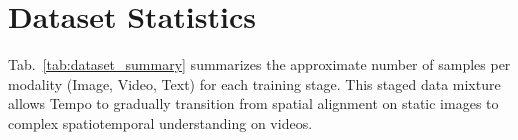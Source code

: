 
\section{Dataset Statistics}
\label{supp:dataset_details}

Tab.~\ref{tab:dataset_summary} summarizes the approximate number of samples per modality (Image, Video, Text) for each training stage. This staged data mixture allows Tempo to gradually transition from spatial alignment on static images to complex spatiotemporal understanding on videos.

\begin{table}[h]
    \centering
    \caption{\textbf{Statistics of training data mixtures.} Approximate number of samples per modality across the four progressive training stages.}
    \label{tab:dataset_summary}
\end{table}



